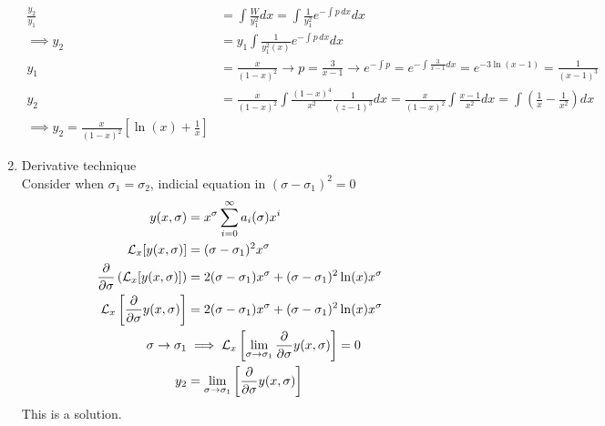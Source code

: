 \documentclass[Maths.tex]{subfiles}
\begin{document}
\begin{example}
\begin{enumerate}
\begin{align*}
        \frac{y_2}{y_1} &= \int \frac{W}{y_1^2}dx = \int \frac{1}{y_1^2}e^{-\int p\,dx}dx \\
        \implies y_2 &= y_1\int \frac{1}{y_1^2(x)}e^{-\int p\,dx}dx \\
        y_1 &= \frac{x}{(1-x)^2} \to p = \frac{3}{x-1} \to e^{-\int p} = e^{-\int \frac{3}{x-1}dx} = e^{-3\ln(x-1)} = \frac{1}{(x-1)^3} \\
        y_2 &= \frac{x}{(1-x)^2} \int \frac{(1-x)^4}{x^2} \frac{1}{(z-1)^3}dx = \frac{x}{(1-x)^2}\int \frac{x-1}{x^2}dx = \int \left(\frac{1}{x} - \frac{1}{x^2}\right) dx \\
        \implies y_2 = \frac{x}{(1-x)^2}\left[\ln(x) + \frac{1}{x}\right]
    \end{align*}
    \item Derivative technique \\
    Consider when $\sigma_1 = \sigma_2$, indicial equation in $(\sigma - \sigma_1)^2 = 0$
    \begin{align*}
        y(x,\sigma) &= x^\sigma \sum_{i=0}^\infty a_i(\sigma)x^i \\
        \mathcal{L}_x[y(x,\sigma)] &= (\sigma - \sigma_1)^2 x^\sigma \\
        \frac{\partial}{\partial \sigma}\left(\mathcal{L}_x[y(x,\sigma)]\right) &= 2(\sigma-\sigma_1)x^\sigma + (\sigma-\sigma_1)^2\ln(x)x^\sigma \\
        \mathcal{L}_x\left[\frac{\partial}{\partial \sigma}y(x,\sigma)\right] &=  2(\sigma-\sigma_1)x^\sigma + (\sigma-\sigma_1)^2\ln(x)x^\sigma \\
        \sigma \to \sigma_1 &\implies \mathcal{L}_x\left[\lim_{\sigma\to\sigma_1} \frac{\partial}{\partial\sigma}y(x,\sigma)\right]= 0 \\
        y_2 &= \lim_{\sigma\to\sigma_1}\left[\frac{\partial}{\partial\sigma}y(x,\sigma)\right]
    \end{align*}
    This is a solution.
\end{enumerate}
\end{example}

\chapter{}
\end{document}
